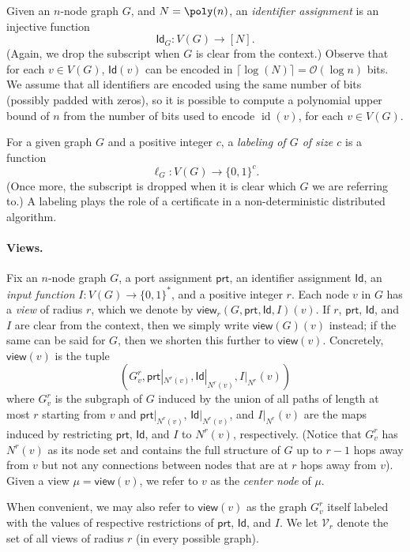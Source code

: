 \documentclass[11pt]{article}
\DeclareMathOperator{\id}{id}
\newcommand*{\cO}{\mathcal{O}}
\newcommand*{\ids}{\mathsf{Id}}
\newcommand*{\ports}{\mathsf{prt}}
\newcommand*{\view}{\mathsf{view}}
\begin{document}
Given an $n$-node graph $G$, and $N = \poly(n)$, an \emph{identifier assignment}
is an injective function 
\[
  \ids_G: V(G) \rightarrow [N].
\]
(Again, we drop the subscript when $G$ is clear from the context.)
Observe that for each $v \in V(G)$, $\ids(v)$ can be encoded in $\lceil \log(N)
\rceil = \cO(\log n)$ bits. 
We assume that all identifiers are encoded using the same number of bits
(possibly padded with zeros), so it is possible to compute a polynomial upper
bound of $n$ from the number of bits used to encode $\id(v)$, for each $v \in
V(G)$. 

For a given graph $G$ and a positive integer $c$, a \emph{labeling of $G$ of
size $c$} is a function 
\[
  \ell_G: V(G) \rightarrow \{0, 1\}^c.
\]
(Once more, the subscript is dropped when it is clear which $G$ we are referring
to.)
A labeling plays the role of a certificate in a non-deterministic distributed
algorithm.

\paragraph{Views.}
Fix an $n$-node graph $G$, a port assignment $\ports$, an identifier assignment
$\ids$, an \emph{input function} $I\colon V(G) \rightarrow \{0,1\}^*$, and a
positive integer $r$.
Each node $v$ in $G$ has a \emph{view} of radius $r$, which we denote by
$\view_r(G,\ports,\ids,I)(v)$.
If $r$, $\ports$, $\ids$, and $I$ are clear from the context, then we simply
write $\view(G)(v)$ instead; if the same can be said for $G$, then we shorten
this further to $\view(v)$.
Concretely, $\view(v)$ is the tuple 
\[
  \left(G_v^r, \ports|_{N^r(v)}, \ids|_{N^r(v)}, I|_{N^r}(v)\right)
\] 
where $G_v^r$ is the subgraph of $G$ induced by the union of all paths of length
at most $r$ starting from $v$ and $\ports|_{N^r(v)}$, $\ids|_{N^r(v)}$, and
$I|_{N^r}(v)$ are the maps induced by restricting $\ports$, $\ids$, and $I$ to
$N^r(v)$, respectively. 
(Notice that $G_v^r$ has $N^r(v)$ as its node set and contains the full
structure of $G$ up to $r-1$ hops away from $v$ but not any connections between
nodes that are at $r$ hops away from $v$).
Given a view $\mu = \view(v)$, we refer to $v$ as the \emph{center node} of
$\mu$.

When convenient, we may also refer to $\view(v)$ as the graph $G_v^r$ itself
labeled with the values of respective restrictions of $\ports$, $\ids$, and $I$.
We let $\mathcal{V}_r$ denote the set of all views of radius $r$ (in every
possible graph).
\end{document}
